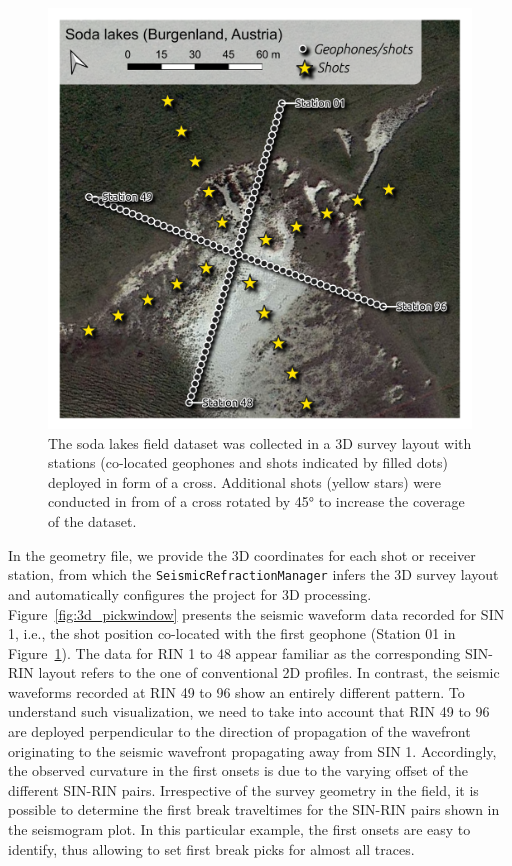 \documentclass[a4paper,fleqn]{cas-sc}
\begin{document}
\begin{figure}
	\centering
	\includegraphics[width=.75\textwidth]{./figures/map_sodalakes.pdf}
	\caption{The soda lakes field dataset was collected in a 3D survey layout with stations (co-located geophones and shots indicated by filled dots) deployed in form of a cross. Additional shots (yellow stars) were conducted in from of a cross rotated by 45° to increase the coverage of the dataset.}
	\label{fig:map_sodalakes}
\end{figure}

In the geometry file, we provide the 3D coordinates for each shot or receiver station, from which the \texttt{SeismicRefractionManager} infers the 3D survey layout and automatically configures the project for 3D processing. 
Figure~\ref{fig:3d_pickwindow} presents the seismic waveform data recorded for SIN 1, i.e., the shot position co-located with the first geophone (Station 01 in Figure~\ref{fig:map_sodalakes}). The data for RIN 1 to 48 appear familiar as the corresponding SIN-RIN layout refers to the one of conventional 2D profiles. In contrast, the seismic waveforms recorded at RIN 49 to 96 show an entirely different pattern. To understand such visualization, we need to take into account that RIN 49 to 96 are deployed perpendicular to the direction of propagation of the wavefront originating
to the seismic wavefront propagating away 
from SIN 1. Accordingly, the observed curvature in the first onsets is due to the varying offset of the different SIN-RIN pairs.
Irrespective of the survey geometry in the field, it is possible to determine the first break traveltimes for the SIN-RIN pairs shown in the seismogram plot. In this particular example, the first onsets are easy to identify, thus allowing to set first break picks for almost all traces. 
\end{document}
